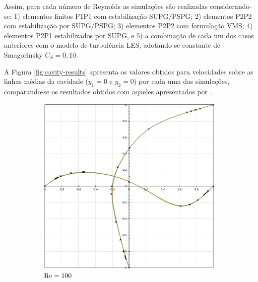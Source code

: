 Assim, para cada número de Reynolds as simulações são realizadas considerando-se: 1) elementos finitos P1P1 com estabilização SUPG/PSPG; 2) elementos P2P2 com estabilização por SUPG/PSPG; 3) elementos P2P2 com formulação VMS; 4) elementos P2P1 estabilizados por SUPG, e 5) a combinação de cada um dos casos anteriores com o modelo de turbulência LES, adotando-se constante de Smagorinsky $C_S=0,10$.

A Figura \ref{fig:cavity-results} apresenta os valores obtidos para velocidades sobre as linhas médias da cavidade ($y_1=0$ e $y_2=0$) por cada uma das simulações, comparando-se os resultados obtidos com aqueles apresentados por .

\begin{figure}[h!]
    \centering
    \caption{Cavidade bidimensional - distribuição de velocidade sobre as linhas médias.}
    \begin{subfigure}{0.4\textwidth}
        \includegraphics[width=\linewidth]{Figuras/Cavity/Re100.pdf}
        \caption{$\mathrm{Re}=100$}
    \end{subfigure}
    \begin{subfigure}{0.4\textwidth}

\end{subfigure}
\end{figure}
